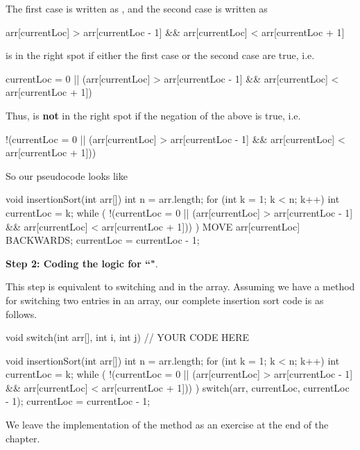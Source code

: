 The first case is written as , and the second case is written as 
\begin{code}
arr[currentLoc] > arr[currentLoc - 1] && arr[currentLoc] < arr[currentLoc + 1]
\end{code}
 is in the right spot if either the first case or the second case are true, i.e.

\begin{code}
currentLoc = 0 || (arr[currentLoc] > arr[currentLoc - 1] && arr[currentLoc] < arr[currentLoc + 1])
\end{code}

Thus,  is \textbf{not} in the right spot if the negation of the above is true, i.e.
\begin{code}
!(currentLoc = 0 || (arr[currentLoc] > arr[currentLoc - 1] && arr[currentLoc] < arr[currentLoc + 1]))
\end{code}

So our pseudocode looks like


\begin{code}
void insertionSort(int arr[]) 
{
    int n = arr.length;
    for (int k = 1; k < n; k++) 
    {
        int currentLoc = k;
        while ( !(currentLoc = 0 || (arr[currentLoc] > arr[currentLoc - 1] && arr[currentLoc] < arr[currentLoc + 1])) ) 
        {
            MOVE arr[currentLoc] BACKWARDS;
            currentLoc = currentLoc - 1;
        }
    }
}
\end{code}
 
\textbf{Step 2: Coding the logic for ``"}. 
 
This step is equivalent to switching  and  in the array. Assuming we have a method  for switching two entries in an array, our complete insertion sort code is as follows.

\begin{code}
void switch(int arr[], int i, int j) 
{
    // YOUR CODE HERE
}

void insertionSort(int arr[]) 
{
    int n = arr.length;
    for (int k = 1; k < n; k++) 
    {
        int currentLoc = k;
        while ( !(currentLoc = 0 || (arr[currentLoc] > arr[currentLoc - 1] && arr[currentLoc] < arr[currentLoc + 1])) ) 
        {
            switch(arr, currentLoc, currentLoc - 1);
            currentLoc = currentLoc - 1;
        }
    }
}
\end{code}

We leave the implementation of the  method as an exercise at the end of the chapter.

